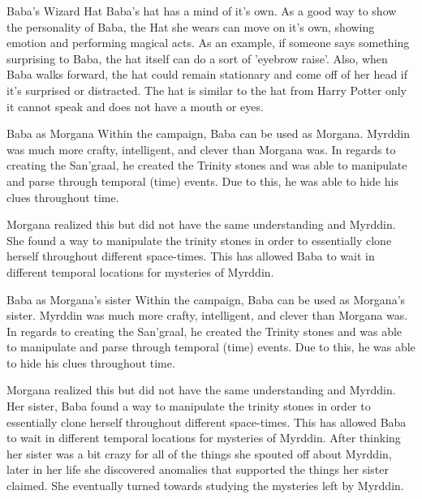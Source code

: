 \begin{commentbox}{Baba's Wizard Hat}
	Baba's hat has a mind of it's own. As a good way to show the personality of Baba, the Hat she wears can move on it's own, showing emotion and performing magical acts. As an example, if someone says something surprising to Baba, the hat itself can do a sort of 'eyebrow raise'. Also, when Baba walks forward, the hat could remain stationary and come off of her head if it's surprised or distracted. The hat is similar to the hat from Harry Potter only it cannot speak and does not have a mouth or eyes.
\end{commentbox}

\begin{commentbox}{Baba as Morgana}
	Within the campaign, Baba can be used as Morgana. Myrddin was much more crafty, intelligent, and clever than Morgana was. In regards to creating the San'graal, he created the Trinity stones and was able to manipulate and parse through temporal (time) events. Due to this, he was able to hide his clues throughout time. 
	
	Morgana realized this but did not have the same understanding and Myrddin. She found a way to manipulate the trinity stones in order to essentially clone herself throughout different space-times. This has allowed Baba to wait in different temporal locations for mysteries of Myrddin.
\end{commentbox}

\begin{commentbox}{Baba as Morgana's sister}
	Within the campaign, Baba can be used as Morgana's sister. Myrddin was much more crafty, intelligent, and clever than Morgana was. In regards to creating the San'graal, he created the Trinity stones and was able to manipulate and parse through temporal (time) events. Due to this, he was able to hide his clues throughout time. 
	
	Morgana realized this but did not have the same understanding and Myrddin. Her sister, Baba found a way to manipulate the trinity stones in order to essentially clone herself throughout different space-times. This has allowed Baba to wait in different temporal locations for mysteries of Myrddin. After thinking her sister was a bit crazy for all of the things she spouted off about Myrddin, later in her life she discovered anomalies that supported the things her sister claimed. She eventually turned towards studying the mysteries left by Myrddin.
\end{commentbox}

